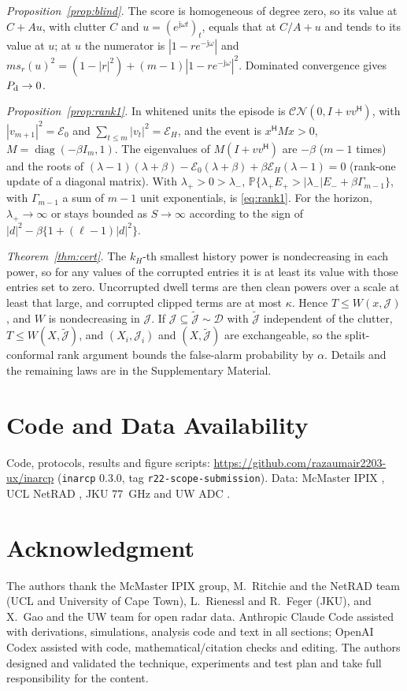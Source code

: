 \documentclass[journal]{IEEEtran}
\newcommand{\PP}{\mathbb{P}}
\begin{document}
\emph{Proposition~\ref{prop:blind}.} The score is homogeneous of degree zero, so its value at $C+Au$, with clutter $C$ and $u=(e^{\mathrm j\omega t})_t$, equals that at $C/A+u$ and tends to its value at $u$; at $u$ the numerator is $|1-re^{-\mathrm j\omega}|$ and $ms_r(u)^2=(1-|r|^2)+(m-1)|1-re^{-\mathrm j\omega}|^2$. Dominated convergence gives $P_{\rm d}\to0$.

\emph{Proposition~\ref{prop:rank1}.} In whitened units the episode is $\mathcal{CN}(0,I+vv^{\mathsf H})$, with $|v_{m+1}|^2=\mathcal E_0$ and $\sum_{t\le m}|v_t|^2=\mathcal E_H$, and the event is $x^{\mathsf H}Mx>0$, $M=\operatorname{diag}(-\beta I_m,1)$. The eigenvalues of $M(I+vv^{\mathsf H})$ are $-\beta$ ($m-1$ times) and the roots of $(\lambda-1)(\lambda+\beta)-\mathcal E_0(\lambda+\beta)+\beta\mathcal E_H(\lambda-1)=0$ (rank-one update of a diagonal matrix). With $\lambda_+>0>\lambda_-$, $\PP\{\lambda_+E_+>|\lambda_-|E_-+\beta\Gamma_{m-1}\}$, with $\Gamma_{m-1}$ a sum of $m-1$ unit exponentials, is \eqref{eq:rank1}. For the horizon, $\lambda_+\to\infty$ or stays bounded as $S\to\infty$ according to the sign of $|d|^2-\beta\{1+(\ell-1)|d|^2\}$.

\emph{Theorem~\ref{thm:cert}.} The $k_H$-th smallest history power is nondecreasing in each power, so for any values of the corrupted entries it is at least its value with those entries set to zero. Uncorrupted dwell terms are then clean powers over a scale at least that large, and corrupted clipped terms are at most $\kappa$. Hence $T\le W(x,\mathcal J)$, and $W$ is nondecreasing in $\mathcal J$. If $\mathcal J\subseteq\tilde{\mathcal J}\sim\mathcal D$ with $\tilde{\mathcal J}$ independent of the clutter, $T\le W(X,\tilde{\mathcal J})$, and $(X_i,\mathcal J_i)$ and $(X,\tilde{\mathcal J})$ are exchangeable, so the split-conformal rank argument bounds the false-alarm probability by $\alpha$. Details and the remaining laws are in the Supplementary Material.

\section*{Code and Data Availability}
Code, protocols, results and figure scripts: \url{https://github.com/razaumair2203-ux/inarcp} (\texttt{inarcp} 0.3.0, tag \texttt{r22-scope-submission}). Data: McMaster IPIX \cite{ipixweb}, UCL NetRAD \cite{netrad2026}, JKU 77~GHz \cite{jku2026} and UW ADC \cite{uwraw2022}.

\section*{Acknowledgment}
The authors thank the McMaster IPIX group, M.~Ritchie and the NetRAD team (UCL and University of Cape Town), L.~Rienessl and R.~Feger (JKU), and X.~Gao and the UW team for open radar data. Anthropic Claude Code assisted with derivations, simulations, analysis code and text in all sections; OpenAI Codex assisted with code, mathematical/citation checks and editing. The authors designed and validated the technique, experiments and test plan and take full responsibility for the content.



\end{document}
